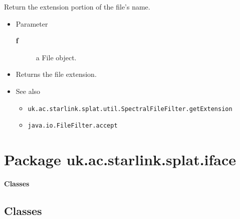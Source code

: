 \begin{desc}Return the extension portion of the file's name.
\begin{itemize}
\item{Parameter
  \begin{description}
   \item[\textbf{f}]{a File object.}
  \end{description}}
\end{itemize}
\begin{itemize}
\item{Returns the file extension. }
\item{{See also}
  \begin{itemize}
   \item{\texttt{uk.ac.starlink.splat.util.SpectralFileFilter.getExtension} {
}
}
   \item{\texttt{java.io.FileFilter.accept} {
}
}
  \end{itemize}
}
\end{itemize}
\end{desc}

\clearpage


\section{Package uk.ac.starlink.splat.iface}

\vspace{.13in}
\hbox{\textbf{Classes}}
\vspace{.13in}
\clearpage
\subsection{Classes}




\vspace{.09in}


